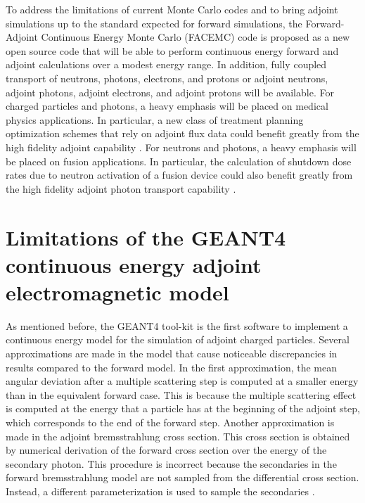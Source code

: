 \documentclass[letterpaper,12pt]{article}
\begin{document}
To address the limitations of current Monte Carlo codes and to bring adjoint simulations up to the standard expected for forward simulations, the Forward-Adjoint Continuous Energy Monte Carlo (FACEMC) code is proposed as a new open source code that will be able to perform continuous energy forward and adjoint calculations over a modest energy range. In addition, fully coupled transport of neutrons, photons, electrons, and protons or adjoint neutrons, adjoint photons, adjoint electrons, and adjoint protons will be available. For charged particles and photons, a heavy emphasis will be placed on medical physics applications. In particular, a new class of treatment planning optimization schemes that rely on adjoint flux data could benefit greatly from the high fidelity adjoint capability \cite{yoo_optimization_2003, chaswal_adjoint_2007, wang_adjoint_2005}. For neutrons and photons, a heavy emphasis will be placed on fusion applications. In particular, the calculation of shutdown dose rates due to neutron activation of a fusion device could also benefit greatly from the high fidelity adjoint photon transport capability \cite{robinson_rigorous_2011}. 

\section{Limitations of the GEANT4 continuous energy adjoint electromagnetic model}
As mentioned before, the GEANT4 tool-kit is the first software to implement a continuous energy model for the simulation of adjoint charged particles. Several approximations are made in the model that cause noticeable discrepancies in results compared to the forward model. In the first approximation, the mean angular deviation after a multiple scattering step is computed at a smaller energy than in the equivalent forward case. This is because the multiple scattering effect is computed at the energy that a particle has at the beginning of the adjoint step, which corresponds to the end of the forward step. Another approximation is made in the adjoint bremsstrahlung cross section. This cross section is obtained by numerical derivation of the forward cross section over the energy of the secondary photon. This procedure is incorrect because the secondaries in the forward bremsstrahlung model are not sampled from the differential cross section. Instead, a different parameterization is used to sample the secondaries \cite{desorgher_implementation_2010}.
\end{document}
